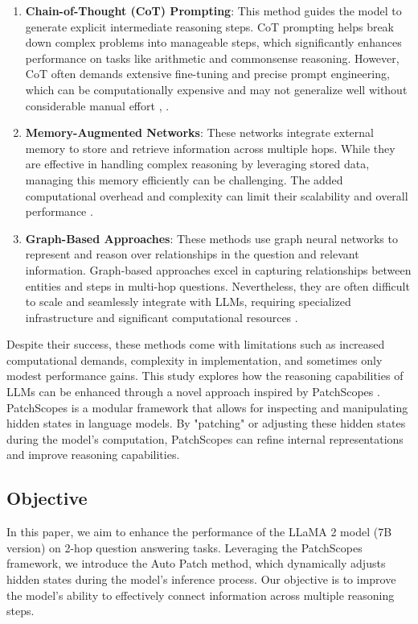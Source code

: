 \documentclass[11pt]{article}
\begin{document}
\begin{enumerate}
    \item \textbf{Chain-of-Thought (CoT) Prompting}: This method guides the model to generate explicit intermediate reasoning steps. CoT prompting helps break down complex problems into manageable steps, which significantly enhances performance on tasks like arithmetic and commonsense reasoning. However, CoT often demands extensive fine-tuning and precise prompt engineering, which can be computationally expensive and may not generalize well without considerable manual effort \cite{wei2023chainofthought}, \cite{zhang2022automatic}.
    
    \item \textbf{Memory-Augmented Networks}: These networks integrate external memory to store and retrieve information across multiple hops. While they are effective in handling complex reasoning by leveraging stored data, managing this memory efficiently can be challenging. The added computational overhead and complexity can limit their scalability and overall performance \cite{wang-etal-2023-towards}.
    
    \item \textbf{Graph-Based Approaches}: These methods use graph neural networks to represent and reason over relationships in the question and relevant information. Graph-based approaches excel in capturing relationships between entities and steps in multi-hop questions. Nevertheless, they are often difficult to scale and seamlessly integrate with LLMs, requiring specialized infrastructure and significant computational resources \cite{de-cao-etal-2019-question}.
\end{enumerate}

Despite their success, these methods come with limitations such as increased computational demands, complexity in implementation, and sometimes only modest performance gains. This study explores how the reasoning capabilities of LLMs can be enhanced through a novel approach inspired by PatchScopes \cite{ghandeharioun2024patchscopes}. PatchScopes is a modular framework that allows for inspecting and manipulating hidden states in language models. By "patching" or adjusting these hidden states during the model's computation, PatchScopes can refine internal representations and improve reasoning capabilities.

\subsection*{Objective}
In this paper, we aim to enhance the performance of the LLaMA 2 model (7B version) on 2-hop question answering tasks. Leveraging the PatchScopes framework, we introduce the Auto Patch method, which dynamically adjusts hidden states during the model's inference process. Our objective is to improve the model's ability to effectively connect information across multiple reasoning steps.
\end{document}
